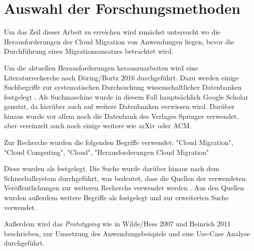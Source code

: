 \section{Auswahl der Forschungsmethoden}
\label{sec:auswahl_forschungsmethoden}

Um das Zeil dieser Arbeit zu erreichen wird zunächst untersucht wo die Herausforderungen der Cloud Migration von Anwendungen liegen, bevor die Durchführung eines Migrationsansatzes betrachtet wird.

Um die aktuellen Herausforderungen herauszuarbeiten wird eine Literaturrecherche nach Döring/Bortz 2016 durchgeführt. Dazu werden einige Suchbegriffe zur systematischen Durchsuchung wissenschaftlicher Datenbanken festgelegt \cite[Vgl.][S. 158]{Doering2016}. Als Suchmaschine wurde in diesem Fall hauptsächlich Google Scholar genutzt, da hierüber auch auf weitere Datenbanken verwiesen wird. Darüber hinaus wurde vor allem noch die Datenbank des Verlages Springer verwendet, aber vereinzelt auch noch einige weitere wie arXiv oder ACM.

Zur Recherche wurden die folgenden Begriffe verwendet: "Cloud Migration", "Cloud Computing", "Cloud", "Herausforderungen Cloud Migration"

Diese wurden als \textbf{\grqq{}} \cite[S. 158]{Doering2016} festgelegt. Die Suche wurde darüber hinaus nach dem Schneeballsystem durchgeführt, was bedeutet, dass die Quellen der verwendeten Veröffentlichungen zur weiteren Recherche verwendet werden \cite[Vgl.][S. 160]{Doering2016}. Aus den Quellen wurden außerdem weitere Begriffe als \textbf{\grqq{}} \cite[S. 158]{Doering2016} festgelegt und zur erweiterten Suche verwendet.

Außerdem wird das \textit{Prototyping} wie in Wilde/Hess 2007 und Heinrich 2011 beschrieben, zur Umsetzung des Anwendungsbeispiels und eine Use-Case Analyse durchgeführt.